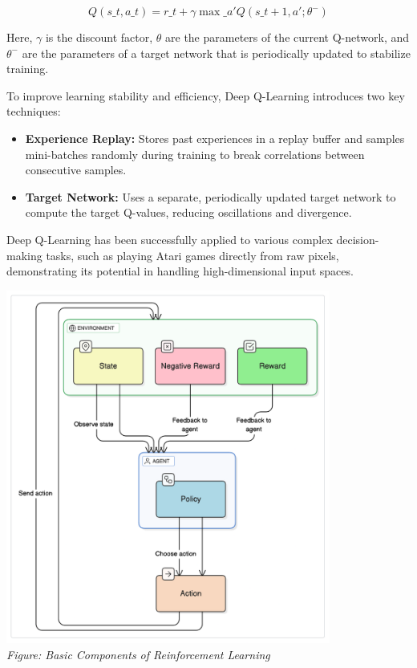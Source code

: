 \documentclass{report}
\begin{document}
\begin{equation}
Q(s\_t, a\_t) = r\_t + \gamma \max\_{a'} Q(s\_{t+1}, a'; \theta^-)
\end{equation}

Here, $\gamma$ is the discount factor, $\theta$ are the parameters of the current Q-network, and $\theta^-$ are the parameters of a target network that is periodically updated to stabilize training.

To improve learning stability and efficiency, Deep Q-Learning introduces two key techniques:
\begin{itemize}
\item \textbf{Experience Replay:} Stores past experiences in a replay buffer and samples mini-batches randomly during training to break correlations between consecutive samples.
\item \textbf{Target Network:} Uses a separate, periodically updated target network to compute the target Q-values, reducing oscillations and divergence.
\end{itemize}

Deep Q-Learning has been successfully applied to various complex decision-making tasks, such as playing Atari games directly from raw pixels, demonstrating its potential in handling high-dimensional input spaces.


 \begin{center}
    \includegraphics[width=0.8\textwidth]{images/rl-diagram.png} \\
    \textit{Figure: Basic Components of Reinforcement Learning}
  \end{center}
\end{document}
